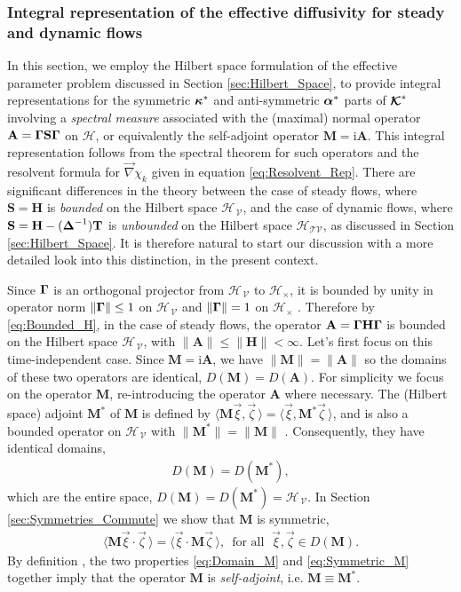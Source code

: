 \documentclass[11pt]{amsart}
\newcommand{\I}{\mathrm{i}}
\newcommand{\Mb}{\mathbf{M}}
\newcommand{\Tb}{\mathbf{T}}
\newcommand{\Hb}{\mathbf{H}}
\newcommand{\Sb}{\mathbf{S}}
\newcommand{\Ab}{\mathbf{A}}
\newcommand\Kbc{\mbox{\boldmath${\mathcal{K}}$}}
\newcommand{\Tc}{\mathcal{T}}
\newcommand{\Vc}{\mathcal{V}}
\newcommand{\Hs}{\mathscr{H}}
\newcommand\balpha{\mbox{\boldmath${\alpha}$}}
\newcommand\bDelta{\mbox{\boldmath${\Delta}$}}
\newcommand\bkappa{\mbox{\boldmath${\kappa}$}}
\newcommand\bGamma{\mbox{\boldmath${\Gamma}$}}
\begin{document}
\subsubsection{Integral representation of the effective diffusivity
  for steady and dynamic flows}\label{sec:Integral_Rep}
%
In this section, we employ the Hilbert space formulation of the
effective parameter problem discussed in Section
\ref{sec:Hilbert_Space}, to provide integral representations for the
symmetric $\bkappa^*$ and anti-symmetric $\balpha^*$ parts of 
$\Kbc^*$ involving a \emph{spectral measure} associated with the
(maximal) normal operator $\Ab=\bGamma\Sb\bGamma$ on
$\Hs$, or equivalently the self-adjoint operator
$\Mb=\I\Ab$. This integral representation follows from the spectral
theorem for such operators \cite{Reed-1980,Stone:64} and the resolvent 
formula for $\vec{\nabla}\chi_k$ given in equation \eqref{eq:Resolvent_Rep}. There
are significant differences in the theory between the case of steady 
flows, where $\Sb=\Hb$ is \emph{bounded} on the Hilbert space
$\Hs_{\,\Vc}$, and the case of dynamic flows, where
$\Sb=\Hb-(\bDelta^{-1})\Tb$ is \emph{unbounded} on the Hilbert space
$\Hs_{\Tc\Vc}$, as discussed in Section \ref{sec:Hilbert_Space}. It is
therefore natural to start our discussion with a more detailed look
into this distinction, in the present context.       





Since $\bGamma$ is an orthogonal projector from $\Hs_{\,\Vc}$ to
$\Hs_\times$, it is bounded by unity in operator norm $\|\bGamma\|\leq1$ on
$\Hs_{\,\Vc}$ and $\|\bGamma\|=1$ on $\Hs_\times$
\cite{Reed-1980,Stone:64}. Therefore by \eqref{eq:Bounded_H}, in the
case of  steady flows, the operator $\Ab=\bGamma\Hb\bGamma$ is bounded
on the Hilbert space $\Hs_{\,\Vc}$, with $\|\Ab\|\leq\|\Hb\|<\infty$. Let's first
focus on this time-independent case. Since $\Mb=\I\Ab$, we have 
$\|\Mb\|=\|\Ab\|$ so the domains of these two operators are identical,
$D(\Mb)=D(\Ab)$. For simplicity we focus on the operator $\Mb$,
re-introducing the operator $\Ab$ where necessary. The (Hilbert space)
adjoint $\Mb^*$ of $\Mb$ is defined by
$\langle\Mb\vec{\xi},\vec{\zeta}\,\rangle=\langle\vec{\xi},\Mb^*\vec{\zeta}\,\rangle$, and is also a
bounded operator on $\Hs_{\,\Vc}$ with $\|\Mb^*\|=\|\Mb\|$
\cite{Reed-1980}. Consequently, they have identical domains,       
%
\begin{align}\label{eq:Domain_M}
  D(\Mb)=D(\Mb^*),
\end{align}
%
which are the entire space, $D(\Mb)=D(\Mb^*)=\Hs_{\,\Vc}$. In
Section \ref{sec:Symmetries_Commute} we show that $\Mb$ is symmetric,
%
\begin{align}\label{eq:Symmetric_M}
  \langle\Mb\vec{\xi}\cdot\vec{\zeta}\,\rangle=\langle\vec{\xi}\cdot\Mb\vec{\zeta}\,\rangle,
  \, \text{ for all } \; \vec{\xi},\vec{\zeta}\in D(\Mb).
\end{align}
%
By definition \cite{Reed-1980,Stone:64}, the two properties
\eqref{eq:Domain_M} and \eqref{eq:Symmetric_M} together imply that the
operator $\Mb$ is \emph{self-adjoint}, i.e. $\Mb\equiv\Mb^*$.
\end{document}
